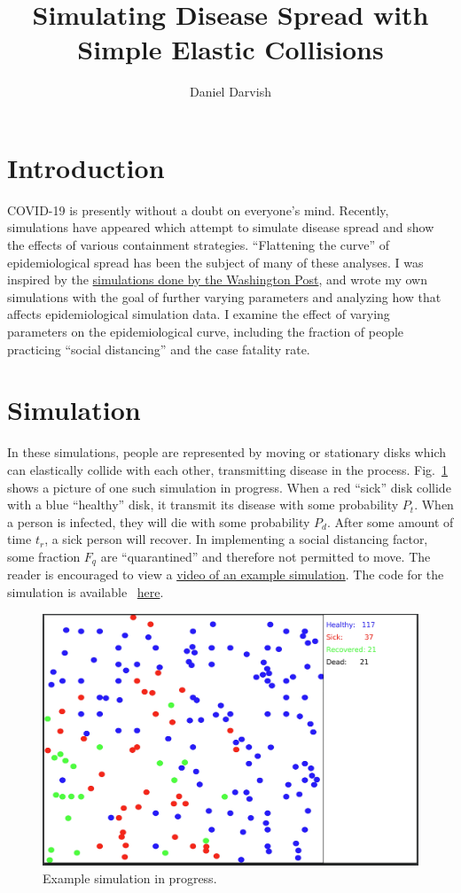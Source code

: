 \documentclass[11pt]{article}
\title{Simulating Disease Spread with Simple Elastic Collisions}
\author{Daniel Darvish}
\date{}
\begin{document}
\maketitle
\section{Introduction}
COVID-19 is presently without a doubt on everyone's mind. Recently, simulations have appeared which attempt to simulate disease spread and show the effects of various containment strategies. ``Flattening the curve'' of epidemiological spread has been the subject of many of these analyses. I was inspired by the \href{https://www.washingtonpost.com/graphics/2020/world/corona-simulator/}{simulations done by the Washington Post}, and wrote my own simulations with the goal of further varying parameters and analyzing how that affects epidemiological simulation data. I examine the effect of varying parameters on the epidemiological curve, including the fraction of people practicing ``social distancing'' and the case fatality rate.
\section{Simulation}
In these simulations, people are represented by moving or stationary disks which can elastically collide with each other, transmitting disease in the process. Fig.~\ref{fig:sim_ex_1} shows a picture of one such simulation in progress. When a red ``sick'' disk collide with a blue ``healthy'' disk, it transmit its disease with some probability $P_{t}$. When a person is infected, they will die with some probability $P_d$. After some amount of time $t_r$, a sick person will recover. In implementing a social distancing factor, some fraction $F_{q}$ are ``quarantined'' and therefore not permitted to move. The reader is encouraged to view a \href{https://www.youtube.com/watch?v=YYKz1-txdYw}{video of an example simulation}. The code for the simulation is available ~\href{https://github.com/dannydarvish/battelle_covid}{here}.

\begin{figure}[h]

    \centering
    \includegraphics[scale=0.15]{figs/sim_ex_1.png}
    \caption{Example simulation in progress.}\label{fig:sim_ex_1}
\end{figure}
\end{document}
